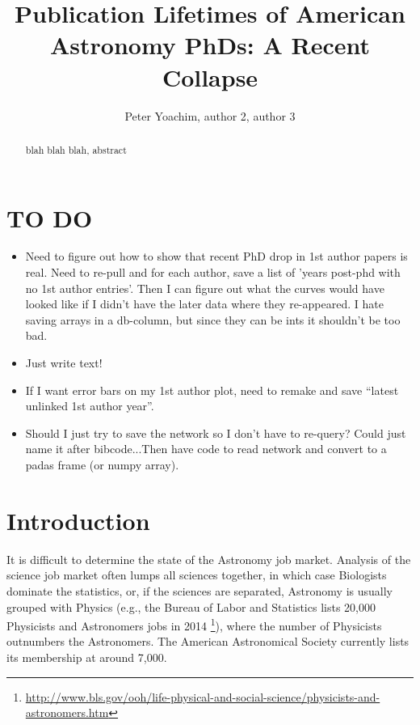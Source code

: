 \documentclass{emulateapj}
\begin{document}
\title{Publication Lifetimes of American Astronomy PhDs: A Recent Collapse}

\author{Peter Yoachim, author 2, author 3 
  }


\begin{abstract}
blah blah blah, abstract

\end{abstract}


\section{TO DO}
\begin{itemize}
\item{Need to figure out how to show that recent PhD drop in 1st author papers is real. Need to re-pull and for each author, save a list of 'years post-phd with no 1st author entries'.  Then I can figure out what the curves would have looked like if I didn't have the later data where they re-appeared. I hate saving arrays in a db-column, but since they can be ints it shouldn't be too bad.}
\item{Just write text! }
\item{If I want error bars on my 1st author plot, need to remake and save ``latest unlinked 1st author year''.}
  \item{Should I just try to save the network so I don't have to re-query? Could just name it after bibcode...Then have code to read network and convert to a padas frame (or numpy array).}
\end{itemize}

\section{Introduction}

It is difficult to determine the state of the Astronomy job market.  Analysis of the science job market often lumps all sciences together, in which case Biologists dominate the statistics, or, if the sciences are separated, Astronomy is usually grouped with Physics (e.g., the Bureau of Labor and Statistics lists 20,000 Physicists and Astronomers jobs in 2014 \footnote{\url{http://www.bls.gov/ooh/life-physical-and-social-science/physicists-and-astronomers.htm}}), where the number of Physicists outnumbers the Astronomers.  The American Astronomical Society currently lists its membership at around 7,000.
\end{document}

